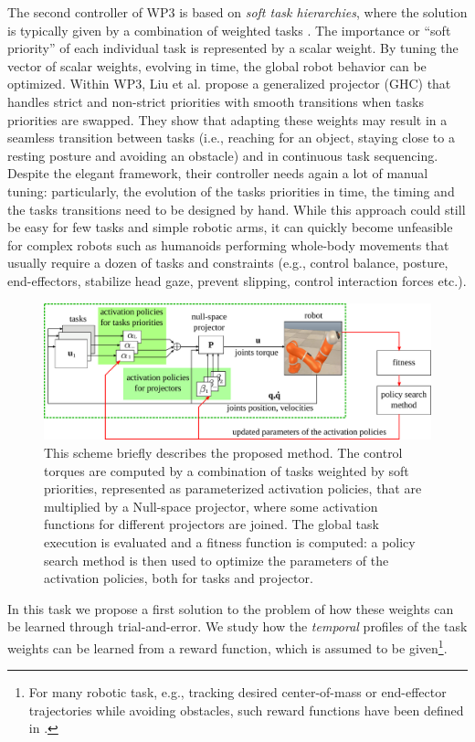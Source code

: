 The second controller of WP3 is based on \textit{soft task hierarchies}, where
the solution is typically given by a combination of weighted tasks
\cite{Salini-2011-ID348}. The importance or ``soft priority'' of each individual
task is represented by a scalar weight. By tuning the vector of scalar weights,
evolving in time, the global robot behavior can be optimized. Within WP3, Liu et
al. \cite{liu_ICRA2015} propose a generalized projector (GHC) that handles
strict and non-strict priorities with smooth transitions when tasks priorities
are swapped. They show that adapting these weights may result in a seamless
transition between tasks (i.e., reaching for an object, staying close to a
resting posture and avoiding an obstacle) and in continuous task sequencing.
Despite the elegant framework, their controller needs again a lot of manual
tuning: particularly, the evolution of the tasks priorities in time, the timing
and the tasks transitions need to be designed by hand. While this approach could
still be easy for few tasks and simple robotic arms, it can quickly become
unfeasible for complex robots such as humanoids performing whole-body movements
that usually require a dozen of tasks and constraints (e.g., control balance,
posture, end-effectors, stabilize head gaze, prevent slipping, control
interaction forces etc.).

\begin{figure}%
\centering
\includegraphics[width=.75\hsize]{./sections/WP4/pics_serena/concept_scheme}
\caption{This scheme briefly describes the proposed method. The control torques are computed by a combination of tasks weighted by soft priorities, represented as parameterized activation policies, that are multiplied by a Null-space projector, where some activation functions for different projectors are joined. The global task execution is evaluated and a fitness function is computed: a policy search method is then used to optimize the parameters of the activation policies, both for tasks and projector. }
\label{figure:scheme}
\end{figure}

In this task we propose a first solution to the problem of how these weights can
be learned through trial-and-error. We study how the \textit{temporal} profiles
of the task weights can be learned from a reward function, which is assumed to
be given\footnote{For many robotic task, e.g., tracking desired center-of-mass
or end-effector trajectories while avoiding obstacles, such reward functions
have been defined in \cite{Kober_IJRR_2013}.}. 

